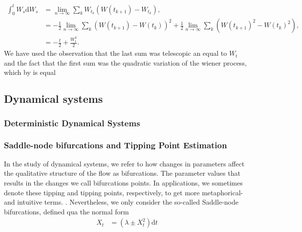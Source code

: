 \begin{align}
    \int_0^t W_s \mathrm{d}W_s &= \lim_{n \to \infty}\sum_k W_{t_k}\left(W(t_{k + 1}) - W_{t_k}\right), \\
    &= -\frac{1}{2}\lim_{n \to \infty}\sum_k \left(W(t_{k + 1}) - W(t_{k})\right)^2+ \frac{1}{2}\lim_{n \to \infty}\sum_k\left(W(t_{k + 1})^2 - W(t_{k})^2\right), \\
    &= -\frac{t}{2} + \frac{W_t^2}{2}.
\end{align}
We have used the observation that the last sum was telescopic an equal to $W_t$ and the fact that the first sum was the quadratic variation of the wiener process, which by \cite[theorem 11.34]{Hansen2022} is equal
\subsection{Dynamical systems}
\subsubsection{Deterministic Dynamical Systems}



\subsubsection{Saddle-node bifurcations and Tipping Point Estimation}
In the study of dynamical systems, we refer to how changes in parameters affect the qualitative structure of the flow as bifurcations. The parameter values that results in the changes we call bifurcations points. In applications, we sometimes denote these tipping and tipping points, respectively, to get more metaphorical- and intuitive terms. \cite{Strogatz2019_gv}. Nevertheless, we only consider the so-called Saddle-node bifurcations, defined qua the normal form
\begin{align}
    X_t &= \left(\lambda \pm X_t^2\right) \mathrm{d}t \label{standardForm}
\end{align}

